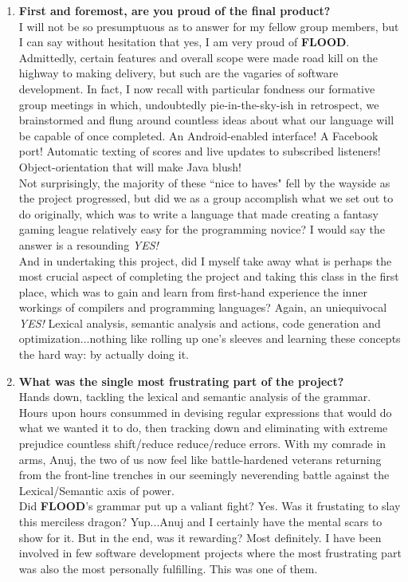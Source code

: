 \documentclass[12pt]{report}
\begin{document}
\begin{enumerate}
\item \textbf{First and foremost, are you proud of the final product?}\\
I will not be so presumptuous as to answer for my fellow group members, but I can say without hesitation that yes, I am very proud of \textbf{FLOOD}. Admittedly, certain features and overall scope were made road kill on the highway to making delivery, but such are the vagaries of software development. In fact, I now recall with particular fondness our formative group meetings in which, undoubtedly pie-in-the-sky-ish in retrospect, we brainstormed and flung around countless ideas about what our language will be capable of once completed. An Android-enabled interface! A Facebook port! Automatic texting of scores and live updates to subscribed listeners! Object-orientation that will make Java blush!\\
Not surprisingly, the majority of these ``nice to haves" fell by the wayside as the project progressed, but did we as a group accomplish what we set out to do originally, which was to write a language that made creating a fantasy gaming league relatively easy for the programming novice? I would say the answer is a resounding \textit{YES!}\\
And in undertaking this project, did I myself take away what is perhaps the most crucial aspect of completing the project and taking this class in the first place, which was to gain and learn from first-hand experience the inner workings of compilers and programming languages? Again, an uniequivocal \textit{YES!} Lexical analysis, semantic analysis and actions, code generation and optimization...nothing like rolling up one's sleeves and learning these concepts the hard way: by actually doing it.
\item \textbf{What was the single most frustrating part of the project?}\\
Hands down, tackling the lexical and semantic analysis of the grammar. Hours upon hours consummed in devising regular expressions that would do what we wanted it to do, then tracking down and eliminating with extreme prejudice countless shift/reduce reduce/reduce errors. With my comrade in arms, Anuj, the two of us now feel like battle-hardened veterans returning from the front-line trenches in our seemingly neverending battle against the Lexical/Semantic axis of power.\\
Did \textbf{FLOOD}'s grammar put up a valiant fight? Yes. Was it frustating to slay this merciless dragon? Yup...Anuj and I certainly have the mental scars to show for it. But in the end, was it rewarding? Most definitely. I have been involved in few software development projects where the most frustrating part was also the most personally fulfilling. This was one of them.

\end{enumerate}
\end{document}
